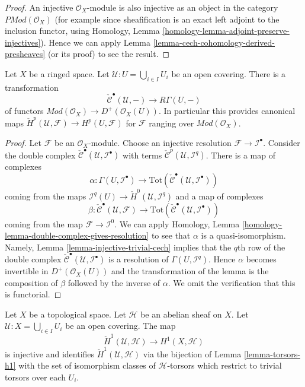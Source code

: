 \begin{proof}
An injective $\mathcal{O}_X$-module is also injective as an object in
the category $\textit{PMod}(\mathcal{O}_X)$ (for example since
sheafification is an exact left adjoint to the inclusion functor,
using Homology, Lemma \ref{homology-lemma-adjoint-preserve-injectives}).
Hence we can apply Lemma \ref{lemma-cech-cohomology-derived-presheaves}
(or its proof) to see the result.
\end{proof}

\begin{lemma}
\label{lemma-cech-cohomology}
Let $X$ be a ringed space.
Let $\mathcal{U} : U = \bigcup_{i \in I} U_i$ be an open covering.
There is a transformation
$$
\check{\mathcal{C}}^\bullet(\mathcal{U}, -)
\longrightarrow
R\Gamma(U, -)
$$
of functors
$\textit{Mod}(\mathcal{O}_X) \to D^{+}(\mathcal{O}_X(U))$.
In particular this provides canonical maps
$\check{H}^p(\mathcal{U}, \mathcal{F}) \to H^p(U, \mathcal{F})$ for
$\mathcal{F}$ ranging over $\textit{Mod}(\mathcal{O}_X)$.
\end{lemma}

\begin{proof}
Let $\mathcal{F}$ be an $\mathcal{O}_X$-module. Choose an injective resolution
$\mathcal{F} \to \mathcal{I}^\bullet$. Consider the double complex
$\check{\mathcal{C}}^\bullet(\mathcal{U}, \mathcal{I}^\bullet)$ with terms
$\check{\mathcal{C}}^p(\mathcal{U}, \mathcal{I}^q)$.
There is a map of complexes
$$
\alpha :
\Gamma(U, \mathcal{I}^\bullet)
\longrightarrow
\text{Tot}(\check{\mathcal{C}}^\bullet(\mathcal{U}, \mathcal{I}^\bullet))
$$
coming from the maps
$\mathcal{I}^q(U) \to \check{H}^0(\mathcal{U}, \mathcal{I}^q)$
and a map of complexes
$$
\beta :
\check{\mathcal{C}}^\bullet(\mathcal{U}, \mathcal{F})
\longrightarrow
\text{Tot}(\check{\mathcal{C}}^\bullet(\mathcal{U}, \mathcal{I}^\bullet))
$$
coming from the map $\mathcal{F} \to \mathcal{I}^0$.
We can apply
Homology, Lemma \ref{homology-lemma-double-complex-gives-resolution}
to see that $\alpha$ is a quasi-isomorphism.
Namely, Lemma \ref{lemma-injective-trivial-cech} implies that
the $q$th row of the double complex
$\check{\mathcal{C}}^\bullet(\mathcal{U}, \mathcal{I}^\bullet)$ is a
resolution of $\Gamma(U, \mathcal{I}^q)$.
Hence $\alpha$ becomes invertible in $D^{+}(\mathcal{O}_X(U))$ and
the transformation of the lemma is the composition of $\beta$
followed by the inverse of $\alpha$. We omit the verification
that this is functorial.
\end{proof}

\begin{lemma}
\label{lemma-cech-h1}
Let $X$ be a topological space. Let $\mathcal{H}$ be an abelian sheaf
on $X$. Let $\mathcal{U} : X = \bigcup_{i \in I} U_i$ be an open covering.
The map
$$
\check{H}^1(\mathcal{U}, \mathcal{H}) \longrightarrow H^1(X, \mathcal{H})
$$
is injective and identifies $\check{H}^1(\mathcal{U}, \mathcal{H})$ via
the bijection of Lemma \ref{lemma-torsors-h1}
with the set of isomorphism classes of $\mathcal{H}$-torsors
which restrict to trivial torsors over each $U_i$.
\end{lemma}

